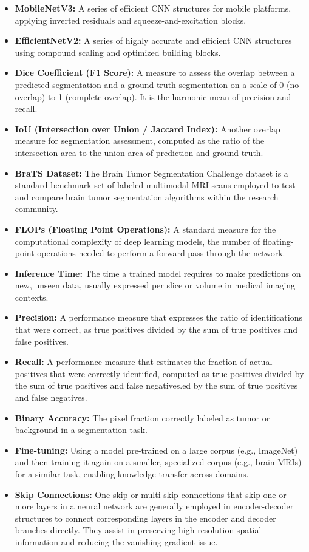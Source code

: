 \begin{itemize}
  \item \textbf{MobileNetV3:} A series of efficient CNN structures for mobile platforms, applying inverted residuals and squeeze-and-excitation blocks.
  \item \textbf{EfficientNetV2:} A series of highly accurate and efficient CNN structures using compound scaling and optimized building blocks.
  \item \textbf{Dice Coefficient (F1 Score):} A measure to assess the overlap between a predicted segmentation and a ground truth segmentation on a scale of 0 (no overlap) to 1 (complete overlap). It is the harmonic mean of precision and recall.
  \item \textbf{IoU (Intersection over Union / Jaccard Index):} Another overlap measure for segmentation assessment, computed as the ratio of the intersection area to the union area of prediction and ground truth.
  \item \textbf{BraTS Dataset:} The Brain Tumor Segmentation Challenge dataset is a standard benchmark set of labeled multimodal MRI scans employed to test and compare brain tumor segmentation algorithms within the research community.
  \item \textbf{FLOPs (Floating Point Operations):} A standard measure for the computational complexity of deep learning models, the number of floating-point operations needed to perform a forward pass through the network.
  \item \textbf{Inference Time:} The time a trained model requires to make predictions on new, unseen data, usually expressed per slice or volume in medical imaging contexts.
  \item \textbf{Precision:} A performance measure that expresses the ratio of identifications that were correct, as true positives divided by the sum of true positives and false positives.
  \item \textbf{Recall:} A performance measure that estimates the fraction of actual positives that were correctly identified, computed as true positives divided by the sum of true positives and false negatives.ed by the sum of true positives and false negatives.
  \item \textbf{Binary Accuracy:} The pixel fraction correctly labeled as tumor or background in a segmentation task.
  \item \textbf{Fine-tuning:} Using a model pre-trained on a large corpus (e.g., ImageNet) and then training it again on a smaller, specialized corpus (e.g., brain MRIs) for a similar task, enabling knowledge transfer across domains.
  \item \textbf{Skip Connections:} One-skip or multi-skip connections that skip one or more layers in a neural network are generally employed in encoder-decoder structures to connect corresponding layers in the encoder and decoder branches directly. They assist in preserving high-resolution spatial information and reducing the vanishing gradient issue.
\end{itemize}